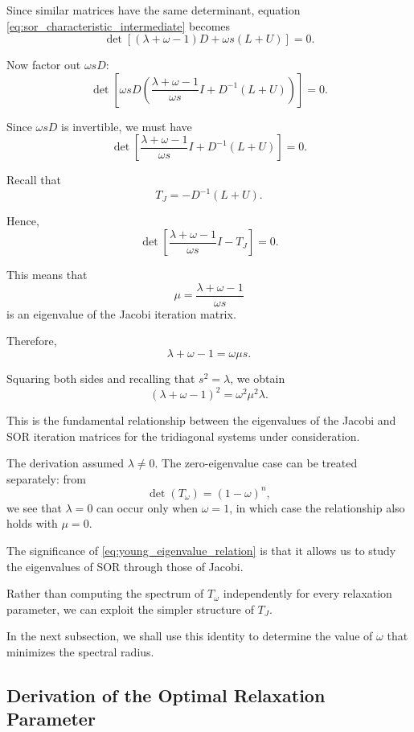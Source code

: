 \documentclass[11pt,a4paper]{article}
\theoremstyle{definition}
\theoremstyle{remark}
\begin{document}
Since similar matrices have the same determinant,
equation
\eqref{eq:sor_characteristic_intermediate}
becomes
\begin{equation}
\boxed{
\det\left[
(\lambda+\omega-1)D
+\omega s(L+U)
\right]=0.
}
\label{eq:sor_jacobi_bridge}
\end{equation}

Now factor out $\omega sD$:
\[
\det\left[
\omega sD
\left(
\frac{\lambda+\omega-1}{\omega s}I
+
D^{-1}(L+U)
\right)
\right]=0.
\]

Since $\omega sD$ is invertible, we must have
\[
\det\left[
\frac{\lambda+\omega-1}{\omega s}I
+
D^{-1}(L+U)
\right]=0.
\]

Recall that
\[
    T_J=-D^{-1}(L+U).
\]

Hence,
\[
\det\left[
\frac{\lambda+\omega-1}{\omega s}I
-T_J
\right]=0.
\]

This means that
\[
    \mu=
    \frac{\lambda+\omega-1}{\omega s}
\]
is an eigenvalue of the Jacobi iteration matrix.

Therefore,
\[
    \lambda+\omega-1=\omega\mu s.
\]

Squaring both sides and recalling that
$s^2=\lambda$, we obtain
\begin{equation}
\boxed{
    (\lambda+\omega-1)^2
    =
    \omega^2\mu^2\lambda.
}
\label{eq:young_eigenvalue_relation}
\end{equation}

This is the fundamental relationship between
the eigenvalues of the Jacobi and SOR iteration
matrices for the tridiagonal systems under
consideration.

The derivation assumed $\lambda\neq0$.
The zero-eigenvalue case can be treated
separately: from
\[
    \det(T_\omega)=(1-\omega)^n,
\]
we see that $\lambda=0$ can occur only
when $\omega=1$, in which case the
relationship also holds with $\mu=0$.

The significance of
\eqref{eq:young_eigenvalue_relation}
is that it allows us to study the eigenvalues
of SOR through those of Jacobi.

Rather than computing the spectrum of
$T_\omega$ independently for every
relaxation parameter, we can exploit the
simpler structure of $T_J$.

In the next subsection, we shall use this
identity to determine the value of $\omega$
that minimizes the spectral radius.

\subsection{Derivation of the Optimal Relaxation Parameter}
\end{document}
